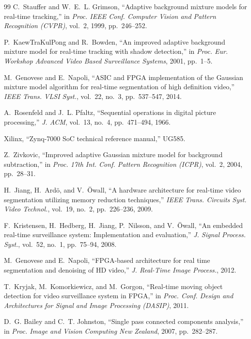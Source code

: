 \documentclass[conference]{IEEEtran}
\begin{document}
\begin{thebibliography}{99}
C.~Stauffer and W.~E.~L. Grimson, ``Adaptive background mixture models for
real-time tracking,'' in \emph{Proc. IEEE Conf. Computer Vision and Pattern
Recognition (CVPR)}, vol.~2, 1999, pp.~246--252.

P.~KaewTraKulPong and R.~Bowden, ``An improved adaptive background mixture
model for real-time tracking with shadow detection,'' in \emph{Proc. Eur.
Workshop Advanced Video Based Surveillance Systems}, 2001, pp.~1--5.

M.~Genovese and E.~Napoli, ``ASIC and FPGA implementation of the Gaussian
mixture model algorithm for real-time segmentation of high definition
video,'' \emph{IEEE Trans. VLSI Syst.}, vol.~22, no.~3, pp.~537--547, 2014.

A.~Rosenfeld and J.~L. Pfaltz, ``Sequential operations in digital picture
processing,'' \emph{J. ACM}, vol.~13, no.~4, pp.~471--494, 1966.

Xilinx, ``Zynq-7000 SoC technical reference manual,'' UG585.

Z.~Zivkovic, ``Improved adaptive Gaussian mixture model for background
subtraction,'' in \emph{Proc. 17th Int. Conf. Pattern Recognition (ICPR)},
vol.~2, 2004, pp.~28--31.

H.~Jiang, H.~Ard\"o, and V.~\"Owall, ``A hardware architecture for real-time
video segmentation utilizing memory reduction techniques,'' \emph{IEEE Trans.
Circuits Syst. Video Technol.}, vol.~19, no.~2, pp.~226--236, 2009.

F.~Kristensen, H.~Hedberg, H.~Jiang, P.~Nilsson, and V.~\"Owall, ``An
embedded real-time surveillance system: Implementation and evaluation,''
\emph{J. Signal Process. Syst.}, vol.~52, no.~1, pp.~75--94, 2008.

M.~Genovese and E.~Napoli, ``FPGA-based architecture for real time
segmentation and denoising of HD video,'' \emph{J. Real-Time Image
Process.}, 2012.

T.~Kryjak, M.~Komorkiewicz, and M.~Gorgon, ``Real-time moving object detection
for video surveillance system in FPGA,'' in \emph{Proc. Conf. Design and
Architectures for Signal and Image Processing (DASIP)}, 2011.

D.~G. Bailey and C.~T. Johnston, ``Single pass connected components
analysis,'' in \emph{Proc. Image and Vision Computing New Zealand}, 2007,
pp.~282--287.


\end{thebibliography}
\end{document}
